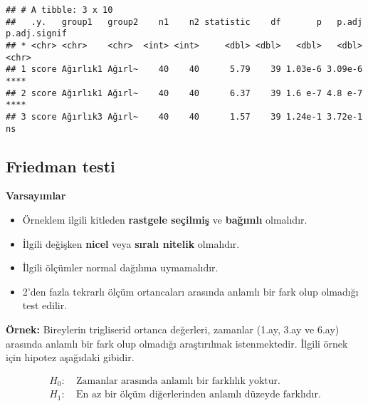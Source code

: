 \documentclass[
]{article}
\newenvironment{Shaded}{\begin{snugshade}}{\end{snugshade}}
\newcommand{\CommentTok}[1]{\textcolor[rgb]{0.56,0.35,0.01}{\textit{#1}}}
\newcommand{\FunctionTok}[1]{\textcolor[rgb]{0.00,0.00,0.00}{#1}}
\newcommand{\NormalTok}[1]{#1}
\newcommand{\OtherTok}[1]{\textcolor[rgb]{0.56,0.35,0.01}{#1}}
\newcommand{\SpecialCharTok}[1]{\textcolor[rgb]{0.00,0.00,0.00}{#1}}
\providecommand{\tightlist}{%
  \setlength{\itemsep}{0pt}\setlength{\parskip}{0pt}}
\begin{document}
\begin{verbatim}
## # A tibble: 3 x 10
##   .y.   group1   group2    n1    n2 statistic    df       p   p.adj p.adj.signif
## * <chr> <chr>    <chr>  <int> <int>     <dbl> <dbl>   <dbl>   <dbl> <chr>       
## 1 score Ağırlık1 Ağırl~    40    40      5.79    39 1.03e-6 3.09e-6 ****        
## 2 score Ağırlık1 Ağırl~    40    40      6.37    39 1.6 e-7 4.8 e-7 ****        
## 3 score Ağırlık3 Ağırl~    40    40      1.57    39 1.24e-1 3.72e-1 ns
\end{verbatim}

\hypertarget{friedman-testi}{%
\subsection{Friedman testi}\label{friedman-testi}}

\textbf{Varsayımlar}

\begin{itemize}
\tightlist
\item
  Örneklem ilgili kitleden \textbf{rastgele seçilmiş} ve
  \textbf{bağımlı} olmalıdır.
\item
  İlgili değişken \textbf{nicel} veya \textbf{sıralı nitelik} olmalıdır.
\item
  İlgili ölçümler normal dağılıma uymamalıdır.
\item
  2'den fazla tekrarlı ölçüm ortancaları arasında anlamlı bir fark olup
  olmadığı test edilir.
\end{itemize}

\textbf{Örnek:} Bireylerin trigliserid ortanca değerleri, zamanlar
(1.ay, 3.ay ve 6.ay) arasında anlamlı bir fark olup olmadığı
araştırılmak istenmektedir. İlgili örnek için hipotez aşağıdaki gibidir.

\begin{align*}
  H_0:&~ \text{Zamanlar arasında anlamlı bir farklılık yoktur.} \\
  H_1:&~ \text{En az bir ölçüm diğerlerinden anlamlı düzeyde farklıdır.}
\end{align*}

\begin{Shaded}
\end{Shaded}
\end{document}
